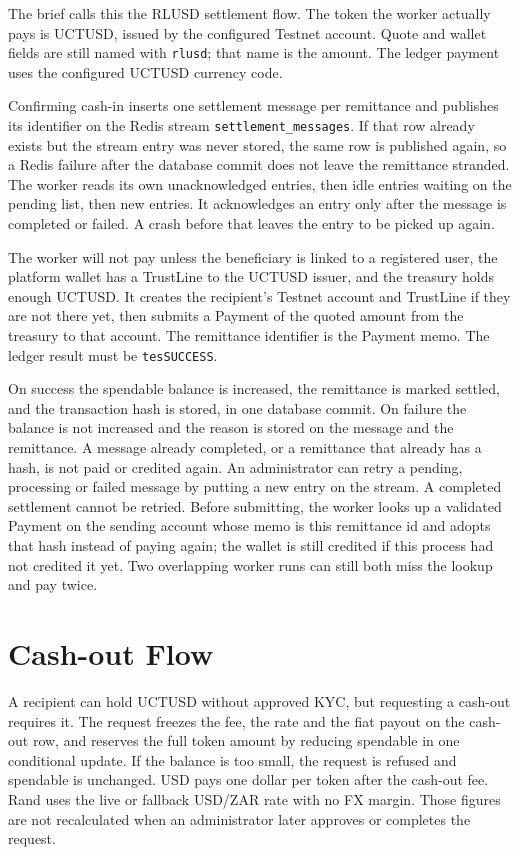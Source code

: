 \documentclass[11pt,a4paper]{article}
\newcommand{\code}[1]{\texttt{\small #1}}
\begin{document}
The brief calls this the RLUSD settlement flow. The token the worker actually pays is UCTUSD, issued by the configured Testnet account. Quote and wallet fields are still named with \code{rlusd}; that name is the amount. The ledger payment uses the configured UCTUSD currency code.

Confirming cash-in inserts one settlement message per remittance and publishes its identifier on the Redis stream \code{settlement\_messages}. If that row already exists but the stream entry was never stored, the same row is published again, so a Redis failure after the database commit does not leave the remittance stranded. The worker reads its own unacknowledged entries, then idle entries waiting on the pending list, then new entries. It acknowledges an entry only after the message is completed or failed. A crash before that leaves the entry to be picked up again.

The worker will not pay unless the beneficiary is linked to a registered user, the platform wallet has a TrustLine to the UCTUSD issuer, and the treasury holds enough UCTUSD. It creates the recipient's Testnet account and TrustLine if they are not there yet, then submits a Payment of the quoted amount from the treasury to that account. The remittance identifier is the Payment memo. The ledger result must be \code{tesSUCCESS}.

On success the spendable balance is increased, the remittance is marked settled, and the transaction hash is stored, in one database commit. On failure the balance is not increased and the reason is stored on the message and the remittance. A message already completed, or a remittance that already has a hash, is not paid or credited again. An administrator can retry a pending, processing or failed message by putting a new entry on the stream. A completed settlement cannot be retried. Before submitting, the worker looks up a validated Payment on the sending account whose memo is this remittance id and adopts that hash instead of paying again; the wallet is still credited if this process had not credited it yet. Two overlapping worker runs can still both miss the lookup and pay twice.

\section{Cash-out Flow}\label{sec:cashout}

A recipient can hold UCTUSD without approved KYC, but requesting a cash-out requires it. The request freezes the fee, the rate and the fiat payout on the cash-out row, and reserves the full token amount by reducing spendable in one conditional update. If the balance is too small, the request is refused and spendable is unchanged. USD pays one dollar per token after the cash-out fee. Rand uses the live or fallback USD/ZAR rate with no FX margin. Those figures are not recalculated when an administrator later approves or completes the request.
\end{document}

